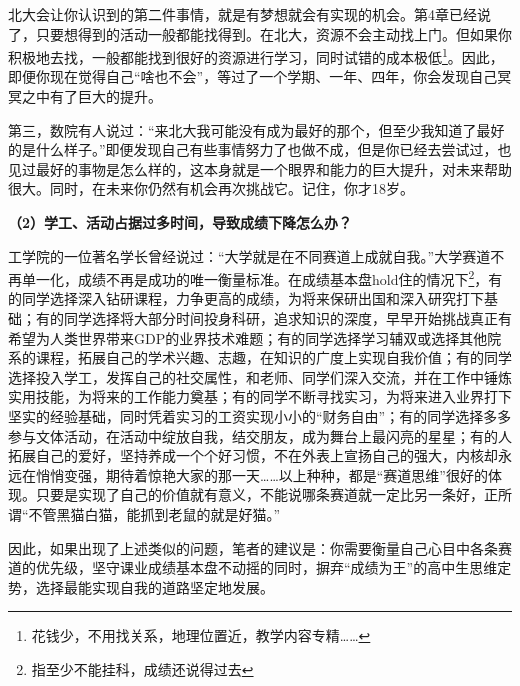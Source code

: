 \vspace{10pt}

北大会让你认识到的第二件事情，就是有梦想就会有实现的机会。第4章已经说了，只要想得到的活动一般都能找得到。在北大，资源不会主动找上门。但如果你积极地去找，一般都能找到很好的资源进行学习，同时试错的成本极低\footnote{花钱少，不用找关系，地理位置近，教学内容专精……}。因此，即便你现在觉得自己“啥也不会”，等过了一个学期、一年、四年，你会发现自己冥冥之中有了巨大的提升。

\vspace{10pt}

第三，数院有人说过：“来北大我可能没有成为最好的那个，但至少我知道了最好的是什么样子。”即便发现自己有些事情努力了也做不成，但是你已经去尝试过，也见过最好的事物是怎么样的，这本身就是一个眼界和能力的巨大提升，对未来帮助很大。同时，在未来你仍然有机会再次挑战它。记住，你才18岁。

\vspace{10pt}

\textbf{（2）学工、活动占据过多时间，导致成绩下降怎么办？}

\vspace{10pt}

工学院的一位著名学长曾经说过：“大学就是在不同赛道上成就自我。”大学赛道不再单一化，成绩不再是成功的唯一衡量标准。在成绩基本盘hold住的情况下\footnote{指至少不能挂科，成绩还说得过去}，有的同学选择深入钻研课程，力争更高的成绩，为将来保研出国和深入研究打下基础；有的同学选择将大部分时间投身科研，追求知识的深度，早早开始挑战真正有希望为人类世界带来GDP的业界技术难题；有的同学选择学习辅双或选择其他院系的课程，拓展自己的学术兴趣、志趣，在知识的广度上实现自我价值；有的同学选择投入学工，发挥自己的社交属性，和老师、同学们深入交流，并在工作中锤炼实用技能，为将来的工作能力奠基；有的同学不断寻找实习，为将来进入业界打下坚实的经验基础，同时凭着实习的工资实现小小的“财务自由”；有的同学选择多多参与文体活动，在活动中绽放自我，结交朋友，成为舞台上最闪亮的星星；有的人拓展自己的爱好，坚持养成一个个好习惯，不在外表上宣扬自己的强大，内核却永远在悄悄变强，期待着惊艳大家的那一天……以上种种，都是“赛道思维”很好的体现。只要是实现了自己的价值就有意义，不能说哪条赛道就一定比另一条好，正所谓“不管黑猫白猫，能抓到老鼠的就是好猫。”

\vspace{10pt}

因此，如果出现了上述类似的问题，笔者的建议是：你需要衡量自己心目中各条赛道的优先级，坚守课业成绩基本盘不动摇的同时，摒弃“成绩为王”的高中生思维定势，选择最能实现自我的道路坚定地发展。

\vspace{10pt}

